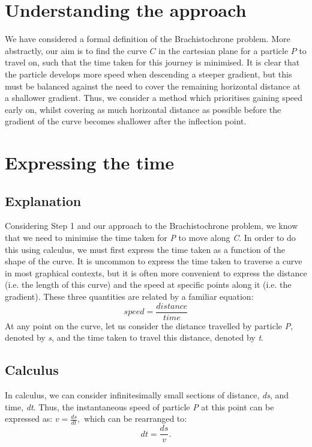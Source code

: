 \documentclass{article}
\begin{document}
\section{Understanding the approach}
We have considered a formal definition of the Brachistochrone problem. More abstractly, our aim is to find the curve $C$ in the cartesian plane for a particle $P$ to travel on, such that the time taken for this journey is minimised. It is clear that the particle develops more speed when descending a steeper gradient, but this must be balanced against the need to cover the remaining horizontal distance at a shallower gradient. Thus, we consider a method which prioritises gaining speed early on, whilst covering as much horizontal distance as possible before the gradient of the curve becomes shallower after the inflection point. 
\section{Expressing the time}
\subsection{Explanation}
Considering Step 1 and our approach to the Brachistochrone problem, we know that we need to minimise the time taken for \textit{P} to move along \textit{C}. In order to do this using calculus, we must first express the time taken as a function of the shape of the curve.
It is uncommon to express the time taken to traverse a curve in most graphical contexts, but it is often more convenient to express the distance (i.e. the length of this curve) and the speed at specific points along it (i.e. the gradient). These three quantities are related by a familiar equation:
\begin{equation}
    speed = \frac{distance}{time}
\end{equation}
At any point on the curve, let us consider the distance travelled by particle \textit{P}, denoted by \textit{s}, and the time taken to travel this distance, denoted by \textit{t}.
\subsection{Calculus}
In calculus, we can consider infinitesimally small sections of distance, \textit{ds}, and time, \textit{dt}.
Thus, the instantaneous speed of particle \textit{P} at this point can be expressed as: $v = \frac{ds}{dt},$ which can be rearranged to:
\begin{equation}
    dt = \frac{ds}{v}.
\end{equation}
\end{document}
